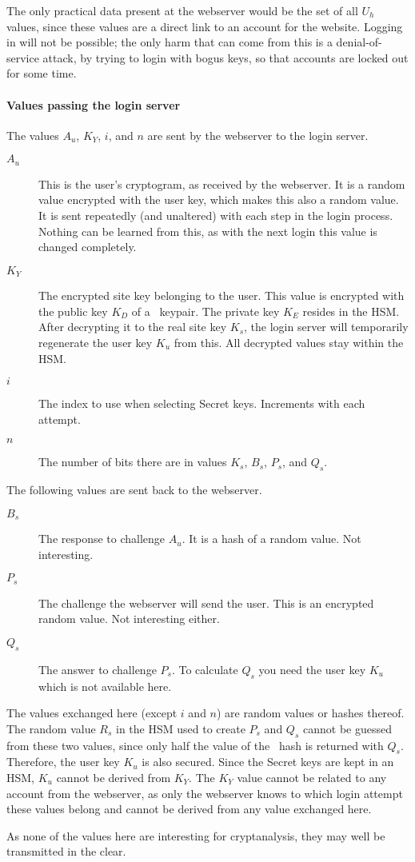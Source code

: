 The only practical data present at the webserver would be the set of all $U_h$ values,
since these values are a direct link to an account for the website.
Logging in will not be possible;
the only harm that can come from this is a denial-of-service attack,
by trying to login with bogus keys,
so that accounts are locked out for some time.
\paragraph{Values passing the login server}
The values $A_u$, $K_Y$, $i$, and $n$ are sent by the webserver to the login server.
\begin{description}
\item[$A_u$]	This is the user's cryptogram, as received by the webserver.
	It is a random value encrypted with the user key,
	which makes this also a random value.
	It is sent repeatedly
	(and unaltered)
	with each step in the login process.
	Nothing can be learned from this,
	as with the next login this value is changed completely.
\item[$K_Y$]	The encrypted site key belonging to the user.
	This value is encrypted with the public key $K_D$ of a \RSA\ keypair.
	The private key $K_E$ resides in the HSM.
	After decrypting it to the real site key $K_s$,
	the login server will temporarily regenerate the user key $K_u$ from this.
	All decrypted values stay within the HSM.
\item[$i$]	The index to use when selecting Secret keys.
	Increments with each attempt.
\item[$n$]	The number of bits there are in values $K_s$, $B_s$, $P_s$, and $Q_s$.
\end{description}
The following values are sent back to the webserver.
\begin{description}
\item[$B_s$]	The response to challenge $A_u$.
	It is a hash of a random value.
	Not interesting.
\item[$P_s$]	The challenge the webserver will send the user.
	This is an encrypted random value.
	Not interesting either.
\item[$Q_s$]	The answer to challenge $P_s$.
	To calculate $Q_s$ you need the user key $K_u$ which is not available here.
\end{description}
The values exchanged here
(except $i$ and $n$)
are random values or hashes thereof.
The random value $R_s$ in the HSM used to create $P_s$ and $Q_s$ cannot be guessed from these two values,
since only half the value of the \SHA\ hash is returned with $Q_s$.
Therefore, the user key $K_u$ is also secured.
Since the Secret keys are kept in an HSM,
$K_u$ cannot be derived from $K_Y$.
The $K_Y$ value cannot be related to any account from the webserver,
as only the webserver knows to which login attempt these values belong
and cannot be derived from any value exchanged here.
\par
As none of the values here are interesting for cryptanalysis,
they may well be transmitted in the clear.

